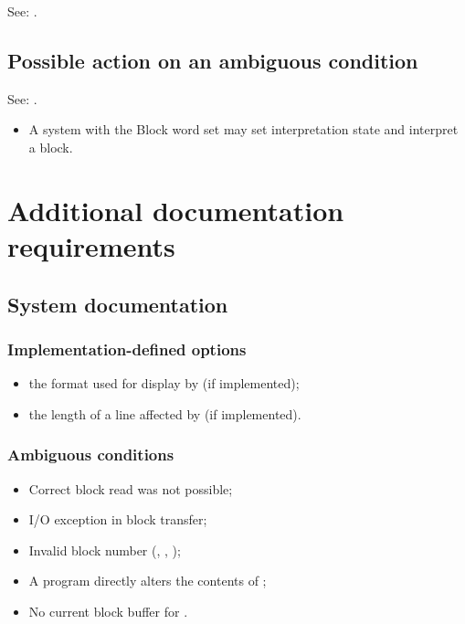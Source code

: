 See: .

\subsection{Possible action on an ambiguous condition} %

See: .

\begin{itemize}
\item A system with the Block word set may set interpretation state
	and interpret a block.
\end{itemize}

\section{Additional documentation requirements} %

\subsection{System documentation} %

\subsubsection{Implementation-defined options} %

\begin{itemize}
\item the format used for display by 
	(if implemented);
\item the length of a line affected by 
	(if implemented).
\end{itemize}

\subsubsection{Ambiguous conditions} %

\begin{itemize}
\item Correct block read was not possible;
\item I/O exception in block transfer;
\item Invalid block number (,
	, );
\item A program directly alters the contents of
	;
\item No current block buffer for .
\end{itemize}

